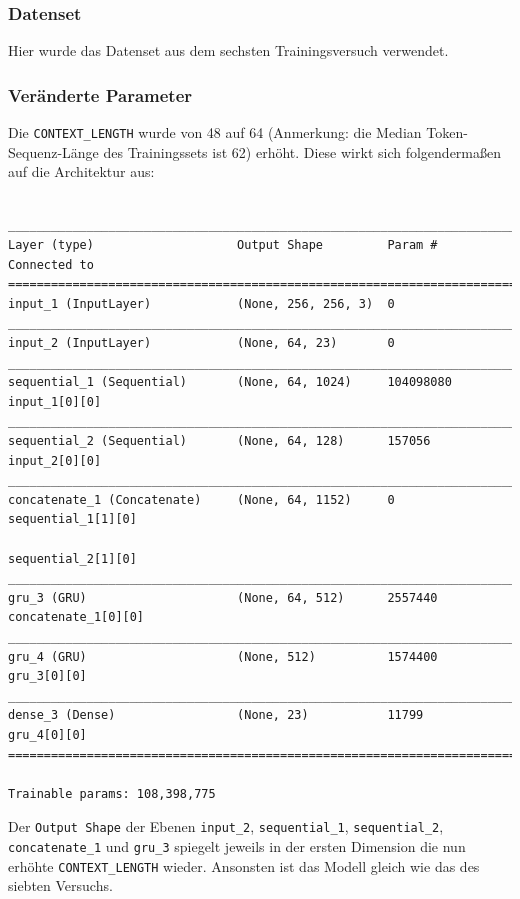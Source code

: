 \documentclass[pdftex,a4paper,halfparskip, article]{scrartcl}
\begin{document}
\subsubsection*{Datenset}

Hier wurde das Datenset aus dem sechsten Trainingsversuch verwendet.

\subsubsection*{Veränderte Parameter}

Die \texttt{CONTEXT\_LENGTH} wurde von 48 auf 64 (Anmerkung: die Median Token-Sequenz-Länge des Trainingssets ist 62) erhöht. Diese wirkt sich folgendermaßen auf die Architektur aus:
\begin{verbatim}

_____________________________________________________________________________
Layer (type)                    Output Shape         Param #     Connected to
=============================================================================
input_1 (InputLayer)            (None, 256, 256, 3)  0
_____________________________________________________________________________
input_2 (InputLayer)            (None, 64, 23)       0
_____________________________________________________________________________
sequential_1 (Sequential)       (None, 64, 1024)     104098080   input_1[0][0]
_____________________________________________________________________________
sequential_2 (Sequential)       (None, 64, 128)      157056      input_2[0][0]
_____________________________________________________________________________
concatenate_1 (Concatenate)     (None, 64, 1152)     0           sequential_1[1][0]
                                                                 sequential_2[1][0]
_____________________________________________________________________________
gru_3 (GRU)                     (None, 64, 512)      2557440     concatenate_1[0][0]
_____________________________________________________________________________
gru_4 (GRU)                     (None, 512)          1574400     gru_3[0][0]
_____________________________________________________________________________
dense_3 (Dense)                 (None, 23)           11799       gru_4[0][0]
=============================================================================

Trainable params: 108,398,775

\end{verbatim}

Der \texttt{Output Shape} der Ebenen \texttt{input\_2},  \texttt{sequential\_1},  \texttt{sequential\_2},  \texttt{concatenate\_1} und \texttt{gru\_3} spiegelt jeweils in der ersten Dimension die nun erhöhte \texttt{CONTEXT\_LENGTH} wieder.
Ansonsten ist das Modell gleich wie das des siebten Versuchs.
\end{document}

